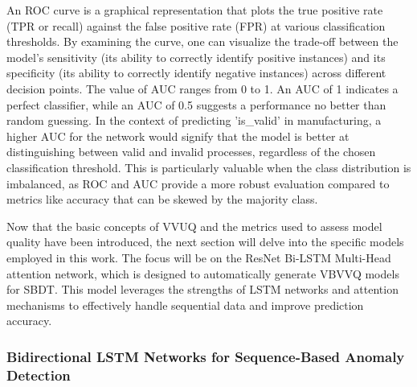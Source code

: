 An ROC curve is a graphical representation that plots the true positive rate (TPR or recall) against the false positive rate (FPR) at various classification thresholds. By examining the curve, one can visualize the trade-off between the model's sensitivity (its ability to correctly identify positive instances) and its specificity (its ability to correctly identify negative instances) across different decision points. The value of AUC ranges from 0 to 1. An AUC of 1 indicates a perfect classifier, while an AUC of 0.5 suggests a performance no better than random guessing. In the context of predicting 'is\_valid' in manufacturing, a higher AUC for the network would signify that the model is better at distinguishing between valid and invalid processes, regardless of the chosen classification threshold. This is particularly valuable when the class distribution is imbalanced, as ROC and AUC provide a more robust evaluation compared to metrics like accuracy that can be skewed by the majority class.

Now that the basic concepts of VVUQ and the metrics used to assess model quality have been introduced, the next section will delve into the specific models employed in this work. The focus will be on the ResNet Bi-LSTM Multi-Head attention network, which is designed to automatically generate VBVVQ models for SBDT. This model leverages the strengths of LSTM networks and attention mechanisms to effectively handle sequential data and improve prediction accuracy.

\subsubsection*{Bidirectional LSTM Networks for Sequence-Based Anomaly Detection}

